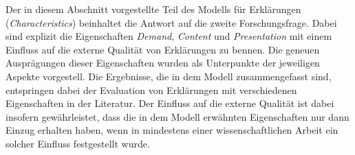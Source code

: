 \smallskip

Der in diesem Abschnitt vorgestellte Teil des Modells für Erklärungen (\textit{Characteristics}) beinhaltet die Antwort auf die zweite Forschungsfrage. Dabei sind explizit die Eigenschaften \textit{Demand}, \textit{Content} und \textit{Presentation} mit einem Einfluss auf die externe Qualität von Erklärungen zu bennen. Die geneuen Ausprägungen dieser Eigenschaften wurden als Unterpunkte der jeweiligen Aspekte vorgestell. Die Ergebnisse, die in dem Modell zusammengefasst sind, entspringen dabei der Evaluation von Erklärungen mit verschiedenen Eigenschaften in der Literatur. Der Einfluss auf die externe Qualität ist dabei insofern gewährleistet, dass die in dem Modell erwähnten Eigenschaften nur dann Einzug erhalten haben, wenn in mindestens einer wissenschaftlichen Arbeit ein solcher Einfluss festgestellt wurde.